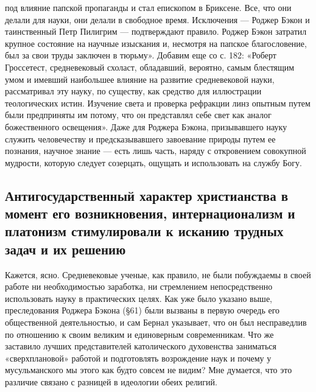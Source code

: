 под влияние папской  пропаганды и стал епископом в  Бриксене. Все, что
они делали  для науки,  они делали в  свободное время.  Исключения ---
Роджер Бэкон  и таинственный  Петр Пилигрим ---  подтверждают правило.
Роджер  Бэкон  затратил  крупное  состояние на  научные  изыскания  и,
несмотря  на  папское благословение,  был  за  свои труды  заключен  в
тюрьму».  Добавим еще  со  с. 182:  «Роберт Гроссетест,  средневековый
схоласт,  обладавший,   вероятно,  самым  блестящим  умом   и  имевший
наибольшее  влияние  на  развитие  средневековой  науки,  рассматривал
эту  науку, по  существу, как  средство для  иллюстрации теологических
истин. Изучение  света и  проверка рефракции  линз опытным  путем были
предприняты  им  потому,  что  он представлял  себе  свет  как  аналог
божественного освещения». Даже для  Роджера Бэкона, призывавшего науку
служить человечеству  и предсказывавшего  завоевание природы  путем ее
познания, научное  знание ---  есть лишь  часть, наряду  с откровением
совокупной мудрости, которую следует созерцать, ощущать и использовать
на службу Богу.

\subsection{Антигосударственный  характер  христианства в  момент  его
возникновения,  интернационализм и  платонизм стимулировали  к исканию
трудных задач и их решению}

Кажется, ясно.  Средневековые ученые, как правило,  не были побуждаемы
в   своей  работе   ни   необходимостью   заработка,  ни   стремлением
непосредственно использовать науку в  практических целях. Как уже было
указано выше, преследования Роджера Бэкона (§61) были вызваны в первую
очередь его  общественной деятельностью,  и сам Бернал  указывает, что
он  был  несправедлив  по  отношению к  своим  великим  и  единоверным
современникам.  Что же  заставило лучших  представителей католического
духовенства   заниматься   «сверхплановой»  работой   и   подготовлять
возрождение наук и  почему у мусульманского мы этого  как будто совсем
не  видим?  Мне  думается,  что  это различие  связано  с  разницей  в
идеологии обеих религий.

